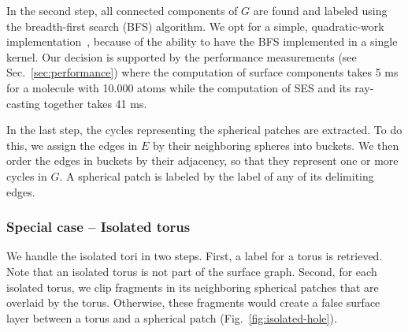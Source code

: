 In the second step, all connected components of $G$ are found and labeled using the breadth-first search (BFS) algorithm.
We opt for a simple, quadratic-work implementation~\cite{merrill2012scalable}, because of the ability to have the BFS implemented in a single kernel.
Our decision is supported by the performance measurements (see Sec.~\ref{sec:performance}) where the computation of surface components takes {\tweakedsim}5 ms for a molecule with {\tweakedsim}10.000 atoms while the computation of SES and its ray-casting together takes {\tweakedsim}41 ms.

In the last step, the cycles representing the spherical patches are extracted.
To do this, we assign the edges in $E$ by their neighboring spheres into buckets.
We then order the edges in buckets by their adjacency, so that they represent one or more cycles in $G$.
A spherical patch is labeled by the label of any of its delimiting edges.

\subsubsection{Special case -- Isolated torus}
\label{sec:isolated}

We handle the isolated tori in two steps.
First, a label for a torus is retrieved. 
Note that an isolated torus is not part of the surface graph.
Second, for each isolated torus, we clip fragments in its neighboring spherical patches that are overlaid by the torus. 
Otherwise, these fragments would create a false surface layer between a torus and a spherical patch (Fig.~\ref{fig:isolated-hole}).

